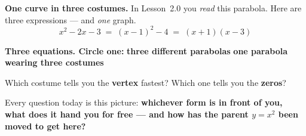 \boxguard[18]
\begin{hookbox}
\small
\begin{minipage}[c]{0.52\linewidth}
\textbf{One curve in three costumes.} In Lesson~2.0 you \emph{read} this parabola. Here are
three expressions --- and \emph{one} graph.
\[ x^2-2x-3 \;=\; (x-1)^2-4 \;=\; (x+1)(x-3) \]
\end{minipage}\hfill
\begin{minipage}[c]{0.44\linewidth}\centering
{}
\end{minipage}
\par\vspace{5pt}
\textbf{Three equations. Circle one:} \quad \textbf{three different parabolas} \qquad
\textbf{one parabola wearing three costumes}
\par\vspace{4pt}
Which costume tells you the \textbf{vertex} fastest?  \quad Which one tells you the
\textbf{zeros}? 
\par\vspace{4pt}
Every question today is this picture: \textbf{whichever form is in front of you, what does it
hand you for free --- and how has the parent $y=x^2$ been moved to get here?}
\end{hookbox}

